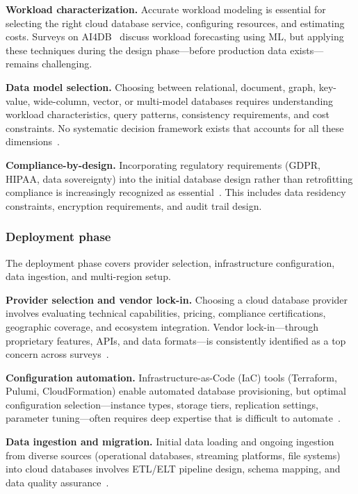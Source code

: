 \documentclass[a4paper,fleqn]{cas-sc}
\begin{document}
\textbf{Workload characterization.} Accurate workload modeling is essential for selecting the right cloud database service, configuring resources, and estimating costs. Surveys on AI4DB~\cite{Zhou2022AI4DB} discuss workload forecasting using ML, but applying these techniques during the design phase---before production data exists---remains challenging.

\textbf{Data model selection.} Choosing between relational, document, graph, key-value, wide-column, vector, or multi-model databases requires understanding workload characteristics, query patterns, consistency requirements, and cost constraints. No systematic decision framework exists that accounts for all these dimensions~\cite{Lu2019MultiModel}.

\textbf{Compliance-by-design.} Incorporating regulatory requirements (GDPR, HIPAA, data sovereignty) into the initial database design rather than retrofitting compliance is increasingly recognized as essential~\cite{Politou2018GDPR}. This includes data residency constraints, encryption requirements, and audit trail design.

\subsubsection{Deployment phase}
\label{subsubsec:deployment}

The deployment phase covers provider selection, infrastructure configuration, data ingestion, and multi-region setup.

\textbf{Provider selection and vendor lock-in.} Choosing a cloud database provider involves evaluating technical capabilities, pricing, compliance certifications, geographic coverage, and ecosystem integration. Vendor lock-in---through proprietary features, APIs, and data formats---is consistently identified as a top concern across surveys~\cite{Opara2017LockIn,Li2024CloudNativeSurvey}.

\textbf{Configuration automation.} Infrastructure-as-Code (IaC) tools (Terraform, Pulumi, CloudFormation) enable automated database provisioning, but optimal configuration selection---instance types, storage tiers, replication settings, parameter tuning---often requires deep expertise that is difficult to automate~\cite{Zhang2022CDBTune}.

\textbf{Data ingestion and migration.} Initial data loading and ongoing ingestion from diverse sources (operational databases, streaming platforms, file systems) into cloud databases involves ETL/ELT pipeline design, schema mapping, and data quality assurance~\cite{Mathew2021CloudMigration}.
\end{document}
